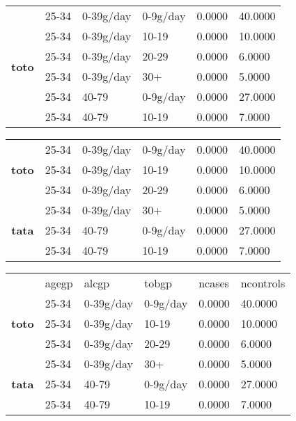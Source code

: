 \documentclass{article}
\begin{document}
\begin{table}
\begin{tabular}{c|lllll|}
\multirow{6}{*}{\textbf{toto}}  &  25-34 & 0-39g/day & 0-9g/day & 0.0000 & 40.0000  \\
 &  25-34 & 0-39g/day & 10-19    & 0.0000 & 10.0000  \\\hline
 &  25-34 & 0-39g/day & 20-29    & 0.0000 & 6.0000   \\\hline
 &  25-34 & 0-39g/day & 30+      & 0.0000 & 5.0000   \\\hline
 &  25-34 & 40-79     & 0-9g/day & 0.0000 & 27.0000  \\\hline
 &  25-34 & 40-79     & 10-19    & 0.0000 & 7.0000   \\\hline
\end{tabular}
\end{table}

\begin{table}
\begin{tabular}{c|lllll|}
\hline
\multirow{3}{*}{\textbf{toto}}  &  25-34 & 0-39g/day & 0-9g/day & 0.0000 & 40.0000  \\
 &  25-34 & 0-39g/day & 10-19    & 0.0000 & 10.0000  \\
 &  25-34 & 0-39g/day & 20-29    & 0.0000 & 6.0000   \\\cline{1-1}
\multirow{3}{*}{\textbf{tata}}  &  25-34 & 0-39g/day & 30+      & 0.0000 & 5.0000   \\
 &  25-34 & 40-79     & 0-9g/day & 0.0000 & 27.0000  \\
 &  25-34 & 40-79     & 10-19    & 0.0000 & 7.0000   \\
\hline
\end{tabular}
\end{table}

\begin{table}
\begin{tabular}{c|lllll|}
\hline
 &  agegp & alcgp     & tobgp    & ncases & ncontrols  \\
\multirow{3}{*}{\textbf{toto}}  &  25-34 & 0-39g/day & 0-9g/day & 0.0000 & 40.0000    \\
 &  25-34 & 0-39g/day & 10-19    & 0.0000 & 10.0000    \\
 &  25-34 & 0-39g/day & 20-29    & 0.0000 & 6.0000     \\\cline{1-1}\cline{3-4}
\multirow{3}{*}{\textbf{tata}}  &  25-34 & 0-39g/day & 30+      & 0.0000 & 5.0000     \\
 &  25-34 & 40-79     & 0-9g/day & 0.0000 & 27.0000    \\
 &  25-34 & 40-79     & 10-19    & 0.0000 & 7.0000     \\
\hline
\end{tabular}
\end{table}
\end{document}
